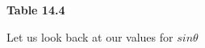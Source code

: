     \begin{center}{\small\bfseries Table 14.4}\end{center}
    \par
        \label{m39414*id84056}Let us look back at our values for $sin\theta $\par 
    \setlength\mytablespace{14\tabcolsep}
    \addtolength\mytablespace{8\arrayrulewidth}
    \setlength\mytablewidth{\linewidth}
    \setlength\mytableroom{\mytablewidth}
    \addtolength\mytableroom{-\mytablespace}
    \setlength\myfixedwidth{0pt}
    \setlength\mystarwidth{\mytableroom}
        \addtolength\mystarwidth{-\myfixedwidth}
        \divide{}
